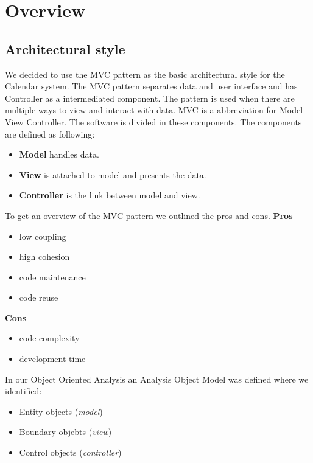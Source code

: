 \section{Overview}

\subsection{Architectural style}
\newline
 We decided to use the MVC pattern as the basic architectural style for the Calendar system.
\newline
\newline
The MVC pattern separates data and user interface and has Controller as a intermediated component. The pattern is used when there are multiple ways to view and interact with data.
\newline
\newline
MVC is a abbreviation for Model View Controller. The software is divided in these components. The components are defined as following:
\begin{itemize}
	\item \textbf{Model} handles data.
	\item \textbf{View} is attached to model and presents the data.
	\item \textbf{Controller} is the link between model and view. 
\end{itemize}
\bigskip


To get an overview of the MVC pattern we outlined the pros and cons.
\newline
\textbf{Pros}
\begin{itemize}
	\item low coupling
	\item high cohesion
	\item code maintenance
	\item code reuse
\end{itemize}
\textbf{Cons}
\begin{itemize}
	\item code complexity
	\item development time
\end{itemize}

\newpage
In our Object Oriented Analysis an Analysis Object Model was defined where we identified:
\begin{itemize}
	\item Entity objects (\emph{model})
	\item Boundary objebts (\emph{view})
	\item Control objects (\emph{controller})
\end{itemize}

